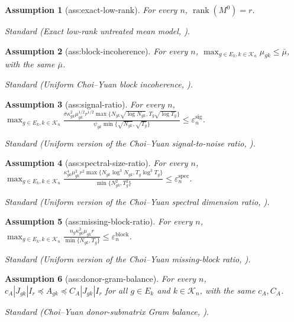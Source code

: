 \documentclass{article}
\newtheorem{assumption}{Assumption}
\begin{document}
\begin{assumption}[ass:exact-low-rank]\label{ass:exact-low-rank}
For every \(n\), \(\operatorname{rank}(M^0)=r\).
\par\smallskip\noindent\emph{Standard} (Exact low-rank untreated mean model, \cite{ChoiYuan2024MNAR}).
\end{assumption}

\begin{assumption}[ass:block-incoherence]\label{ass:block-incoherence}
For every \(n\), \(\max_{g\in E_k,k\in\mathcal K_n}\mu_{gk}\le\bar\mu\), with the same \(\bar\mu\).
\par\smallskip\noindent\emph{Standard} (Uniform Choi--Yuan block incoherence, \cite{ChoiYuan2024MNAR}).
\end{assumption}

\begin{assumption}[ass:signal-ratio]\label{ass:signal-ratio}
For every \(n\), \(\max_{g\in E_k,k\in\mathcal K_n}\frac{\bar\sigma\kappa_{gk}^2\mu_{gk}^{1/2}r^{1/2}\max\{N_{gk}\sqrt{\log N_{gk}},T_g\sqrt{\log T_g}\}}{\psi_{gk}\min\{\sqrt{N_{gk}},\sqrt{T_g}\}}\le\varepsilon_n^{\mathrm{sig}}\).
\par\smallskip\noindent\emph{Standard} (Uniform version of the Choi--Yuan signal-to-noise ratio, \cite{ChoiYuan2024MNAR}).
\end{assumption}

\begin{assumption}[ass:spectral-size-ratio]\label{ass:spectral-size-ratio}
For every \(n\), \(\max_{g\in E_k,k\in\mathcal K_n}\frac{\kappa_{gk}^4\mu_{gk}^2r^2\max\{N_{gk}\log^3N_{gk},T_g\log^3T_g\}}{\min\{N_{gk}^2,T_g^2\}}\le\varepsilon_n^{\mathrm{spec}}\).
\par\smallskip\noindent\emph{Standard} (Uniform version of the Choi--Yuan spectral dimension ratio, \cite{ChoiYuan2024MNAR}).
\end{assumption}

\begin{assumption}[ass:missing-block-ratio]\label{ass:missing-block-ratio}
For every \(n\), \(\max_{g\in E_k,k\in\mathcal K_n}\frac{n_g\kappa_{gk}^2\mu_{gk}r}{\min\{N_{gk},T_g\}}\le\varepsilon_n^{\mathrm{block}}\).
\par\smallskip\noindent\emph{Standard} (Uniform version of the Choi--Yuan missing-block ratio, \cite{ChoiYuan2024MNAR}).
\end{assumption}

\begin{assumption}[ass:donor-gram-balance]\label{ass:donor-gram-balance}
For every \(n\), \(c_A|J_{gk}|I_r\preceq A_{gk}\preceq C_A|J_{gk}|I_r\) for all \(g\in E_k\) and \(k\in\mathcal K_n\), with the same \(c_A,C_A\).
\par\smallskip\noindent\emph{Standard} (Choi--Yuan donor-submatrix Gram balance, \cite{ChoiYuan2024MNAR}).
\end{assumption}
\end{document}
